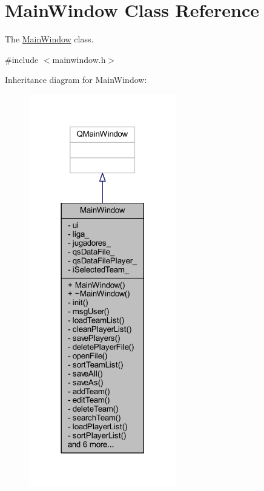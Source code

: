 \hypertarget{class_main_window}{}\section{Main\+Window Class Reference}
\label{class_main_window}


The \hyperlink{class_main_window}{Main\+Window} class.  




{\ttfamily \#include $<$mainwindow.\+h$>$}



Inheritance diagram for Main\+Window\+:\nopagebreak
\begin{figure}[H]
\begin{center}
\leavevmode
\includegraphics[width=182pt]{de/d4b/class_main_window__inherit__graph}
\end{center}
\end{figure}


